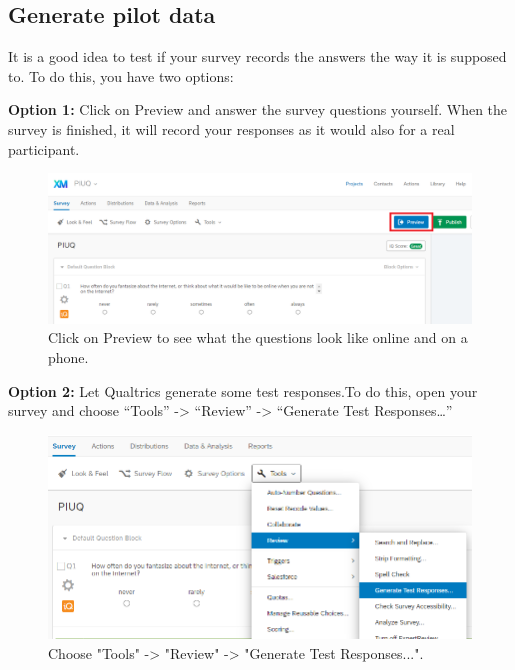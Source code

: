 \documentclass[
]{book}
\begin{document}
\hypertarget{generate-pilot-data}{%
\subsection{Generate pilot data}\label{generate-pilot-data}}

It is a good idea to test if your survey records the answers the way it is supposed to. To do this, you have two options:

\textbf{Option 1:} Click on Preview and answer the survey questions yourself. When the survey is finished, it will record your responses as it would also for a real participant.

\begin{figure}

{\centering \includegraphics[width=0.85\linewidth]{images/Qualtrics/08Preview} 

}

\caption{Click on Preview to see what the questions look like online and on a phone.}\label{fig:Figure11-7}
\end{figure}

\textbf{Option 2:} Let Qualtrics generate some test responses.To do this, open your survey and choose ``Tools'' -\textgreater{} ``Review'' -\textgreater{} ``Generate Test Responses\ldots{}''

\begin{figure}

{\centering \includegraphics[width=0.85\linewidth]{images/Qualtrics/09testresponses1} 

}

\caption{Choose "Tools" -> "Review" -> "Generate Test Responses...".}\label{fig:Figure11-8}
\end{figure}
\end{document}

